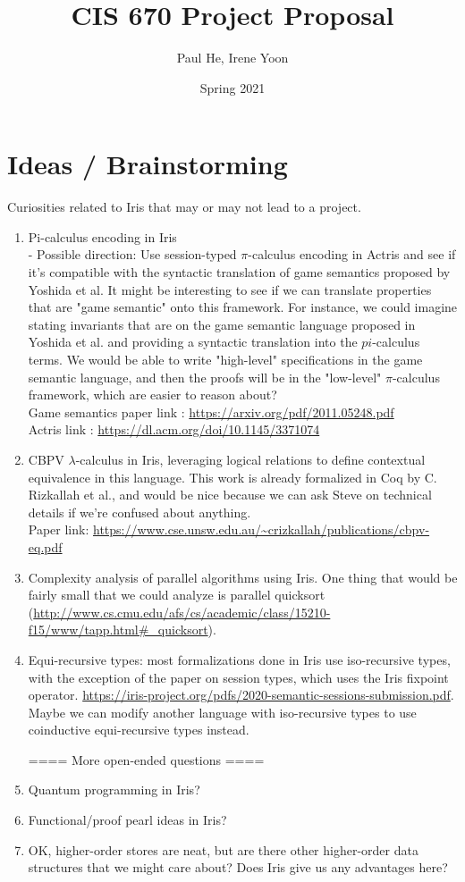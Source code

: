 \documentclass[11pt,twoside]{article}
\begin{document}
\title{CIS 670 Project Proposal}
\author{Paul He, Irene Yoon}
\date{Spring 2021}

\maketitle{}


\section{Ideas / Brainstorming}
Curiosities related to Iris that may or may not lead to a
project.
\begin{enumerate}
    \item Pi-calculus encoding in Iris \\
    - Possible direction: Use session-typed $\pi$-calculus encoding in Actris
    and see if it's compatible with the syntactic translation of game
    semantics proposed by Yoshida et al. It might be interesting to see
    if we can translate properties that are "game semantic" onto this
    framework.
    For instance, we could imagine stating invariants that are on the game
    semantic language proposed in Yoshida et al. and providing a syntactic
    translation into the $pi$-calculus terms. We would be able to write
    "high-level" specifications in the game semantic language, and then
    the proofs will be in the "low-level" $\pi$-calculus framework, which
    are easier to reason about?\\
    Game semantics paper link : \url{https://arxiv.org/pdf/2011.05248.pdf}\\
    Actris link : \url{https://dl.acm.org/doi/10.1145/3371074}
    \item CBPV $\lambda$-calculus in Iris, leveraging logical relations to
    define contextual equivalence in this language. This work is already
    formalized in Coq by C. Rizkallah et al., and would be nice because
    we can ask Steve on technical details if we're confused about anything.\\
    Paper link:
    \url{https://www.cse.unsw.edu.au/~crizkallah/publications/cbpv-eq.pdf}
    \item Complexity analysis of parallel algorithms using Iris.
    One thing that would be fairly small that we could analyze is parallel
    quicksort (\url{http://www.cs.cmu.edu/afs/cs/academic/class/15210-f15/www/tapp.html#_quicksort}).
    \item Equi-recursive types: most formalizations done in Iris use
      iso-recursive types, with the exception of the paper on session types,
      which uses the Iris fixpoint operator.
      \url{https://iris-project.org/pdfs/2020-semantic-sessions-submission.pdf}.
      Maybe we can modify another language with iso-recursive types to use
      coinductive equi-recursive types instead.


    ==== More open-ended questions ====
    \item Quantum programming in Iris?
    \item Functional/proof pearl ideas in Iris?
    \item OK, higher-order stores are neat, but are there other higher-order
    data structures that we might care about? Does Iris give us any
    advantages here?
\end{enumerate}
\end{document}
